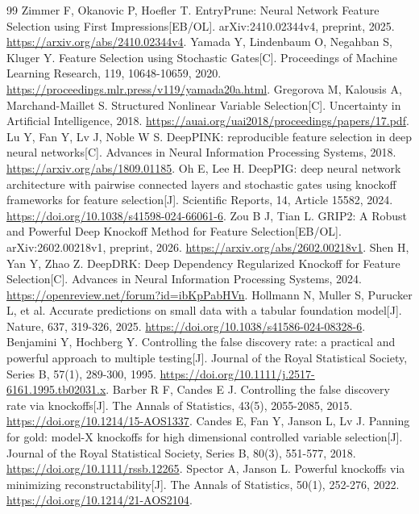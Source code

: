 \documentclass{sufethesismas}
\begin{document}
\begin{thebibliography}{99}
 Zimmer F, Okanovic P, Hoefler T. EntryPrune: Neural Network Feature Selection using First Impressions[EB/OL]. arXiv:2410.02344v4, preprint, 2025. \url{https://arxiv.org/abs/2410.02344v4}.
 Yamada Y, Lindenbaum O, Negahban S, Kluger Y. Feature Selection using Stochastic Gates[C]. Proceedings of Machine Learning Research, 119, 10648-10659, 2020. \url{https://proceedings.mlr.press/v119/yamada20a.html}.
 Gregorova M, Kalousis A, Marchand-Maillet S. Structured Nonlinear Variable Selection[C]. Uncertainty in Artificial Intelligence, 2018. \url{https://auai.org/uai2018/proceedings/papers/17.pdf}.
 Lu Y, Fan Y, Lv J, Noble W S. DeepPINK: reproducible feature selection in deep neural networks[C]. Advances in Neural Information Processing Systems, 2018. \url{https://arxiv.org/abs/1809.01185}.
 Oh E, Lee H. DeepPIG: deep neural network architecture with pairwise connected layers and stochastic gates using knockoff frameworks for feature selection[J]. Scientific Reports, 14, Article 15582, 2024. \url{https://doi.org/10.1038/s41598-024-66061-6}.
 Zou B J, Tian L. GRIP2: A Robust and Powerful Deep Knockoff Method for Feature Selection[EB/OL]. arXiv:2602.00218v1, preprint, 2026. \url{https://arxiv.org/abs/2602.00218v1}.
 Shen H, Yan Y, Zhao Z. DeepDRK: Deep Dependency Regularized Knockoff for Feature Selection[C]. Advances in Neural Information Processing Systems, 2024. \url{https://openreview.net/forum?id=ibKpPabHVn}.
 Hollmann N, Muller S, Purucker L, et al. Accurate predictions on small data with a tabular foundation model[J]. Nature, 637, 319-326, 2025. \url{https://doi.org/10.1038/s41586-024-08328-6}.
 Benjamini Y, Hochberg Y. Controlling the false discovery rate: a practical and powerful approach to multiple testing[J]. Journal of the Royal Statistical Society, Series B, 57(1), 289-300, 1995. \url{https://doi.org/10.1111/j.2517-6161.1995.tb02031.x}.
 Barber R F, Candes E J. Controlling the false discovery rate via knockoffs[J]. The Annals of Statistics, 43(5), 2055-2085, 2015. \url{https://doi.org/10.1214/15-AOS1337}.
 Candes E, Fan Y, Janson L, Lv J. Panning for gold: model-X knockoffs for high dimensional controlled variable selection[J]. Journal of the Royal Statistical Society, Series B, 80(3), 551-577, 2018. \url{https://doi.org/10.1111/rssb.12265}.
 Spector A, Janson L. Powerful knockoffs via minimizing reconstructability[J]. The Annals of Statistics, 50(1), 252-276, 2022. \url{https://doi.org/10.1214/21-AOS2104}.

\end{thebibliography}
\end{document}
